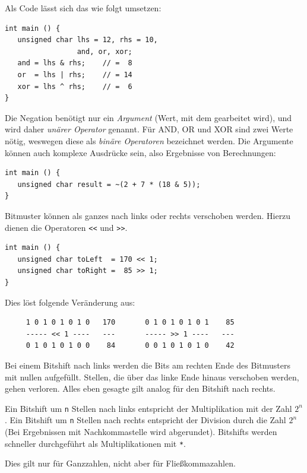 Als Code lässt sich das wie folgt umsetzen:
\begin{codebox}
\begin{verbatim}
int main () {
   unsigned char lhs = 12, rhs = 10,
                 and, or, xor;
   and = lhs & rhs;    // =  8
   or  = lhs | rhs;    // = 14
   xor = lhs ^ rhs;    // =  6
}
\end{verbatim}
\end{codebox}

Die Negation benötigt nur ein \emph{Argument} (Wert, mit dem gearbeitet wird), und wird daher \emph{unärer Operator} genannt. Für AND, OR und XOR sind zwei Werte nötig, weswegen diese als \emph{binäre Operatoren} bezeichnet werden. Die Argumente können auch komplexe Ausdrücke sein, also Ergebnisse von Berechnungen:
\begin{codebox}
\begin{verbatim}
int main () {
   unsigned char result = ~(2 + 7 * (18 & 5));
}
\end{verbatim}
\end{codebox}

Bitmuster können als ganzes nach links oder rechts verschoben werden. Hierzu dienen die Operatoren \texttt{<{}<} und \texttt{>{}>}.
\begin{codebox}
\begin{verbatim}
int main () {
   unsigned char toLeft  = 170 << 1;
   unsigned char toRight =  85 >> 1;
}
\end{verbatim}
\end{codebox}
Dies löst folgende Veränderung aus:
\begin{codebox}
\begin{verbatim}
     1 0 1 0 1 0 1 0   170       0 1 0 1 0 1 0 1    85
     ----- << 1 ----   ---       ----- >> 1 ----   ---
     0 1 0 1 0 1 0 0    84       0 0 1 0 1 0 1 0    42
\end{verbatim}
\end{codebox}
Bei einem Bitshift nach links werden die Bits am rechten Ende des Bitmusters mit nullen aufgefüllt.
Stellen, die über das linke Ende hinaus verschoben werden, gehen verloren.
Alles eben gesagte gilt analog für den Bitshift nach rechts.

\begin{hintbox}
Ein Bitshift um \texttt{n} Stellen nach links entspricht der Multiplikation mit der Zahl $2^{n}$.
Ein Bitshift um \texttt{n} Stellen nach rechts entspricht der Division durch die Zahl $2^{n}$ (Bei Ergebnissen mit Nachkommastelle wird abgerundet). Bitshifts werden schneller durchgeführt als Multiplikationen mit \texttt{*}.

Dies gilt nur für Ganzzahlen, nicht aber für Fließkommazahlen.
\end{hintbox}

